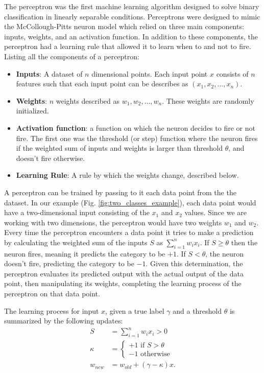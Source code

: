  The perceptron was the first machine learning algorithm designed to solve binary classification in linearly separable conditions. Perceptrons were designed to mimic the McCollough-Pitts neuron model which relied on three main components: inputs, weights, and an activation function. In addition to these components, the perceptron had a learning rule that allowed it to learn when to and not to fire. Listing all the components of a perceptron:
\begin{itemize}
  \item \textbf{Inputs}: A dataset of $n$ dimensional points. Each input point $x$ consists of $n$ features such that each input point can be describes as $(x_1, x_2, \dots, x_n)$.
  \item \textbf{Weights}: $n$ weights described as $w_1, w_2, \dots, w_n$. These weights are randomly initialized.
  \item \textbf{Activation function}: a function on which the neuron decides to fire or not fire. The first one was the threshold (or step) function where the neuron fires if the weighted sum of inputs and weights is larger than threshold $\theta$, and doesn't fire otherwise.
  \item \textbf{Learning Rule}: A rule by which the weights change, described below.
\end{itemize}


A perceptron can be trained by passing to it each data point from the the dataset. In our example (Fig. \ref{fig:two_classes_example}), each data point would have a two-dimensional input consisting of the $x_1$ and $x_2$ values. Since we are working with two dimensions, the perceptron would have two weights $w_1$ and $w_2$. Every time the perceptron encounters a data point it tries to make a prediction by calculating the weighted sum of the inputs $S$  as $\sum_{i=1}^n w_ix_i$. If $S \geq \theta$ then the neuron fires, meaning it predicts the category to be $+1$. If $S < \theta$, the neuron doesn't fire, predicting the category to be $-1$. Given this determination, the perceptron evaluates its predicted output with the actual output of the data point, then manipulating its weights, completing the learning process of the perceptron on that data point. 

The learning process for input $x$, given a true label $\gamma$ and a threshold $\theta$ is summarized by the following updates:
\begin{align}
  S &= \sum_{i=1}^n w_ix_i > 0  \\
  \kappa &= \begin{cases} 
  \label{eq:piecewise_threshold_function}
    +1 \textrm{ if $S$} > \theta \\
    -1 \textrm{ otherwise} 
  \end{cases} \\
  w_{new} &= w_{old} + (\gamma - \kappa)x.
\end{align}

